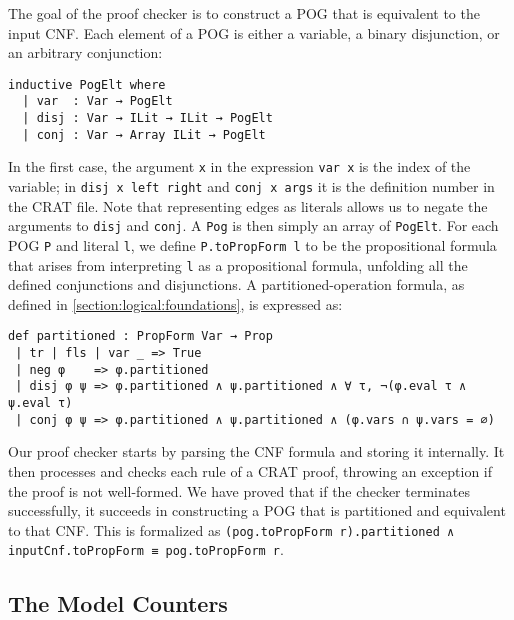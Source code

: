 The goal of the proof checker is to construct a POG that is equivalent to the input CNF.
Each element of a POG  is either a variable, a binary disjunction,
or an arbitrary conjunction:
\begin{lstlisting}
inductive PogElt where
  | var  : Var → PogElt
  | disj : Var → ILit → ILit → PogElt
  | conj : Var → Array ILit → PogElt
\end{lstlisting}
In the first case, the argument \lstinline{x} in the expression
\lstinline{var x} is the index
of the variable; in \lstinline{disj x left right} and \lstinline{conj x args}
it is the definition number in the CRAT file. Note that representing edges as literals allows us to negate the arguments to \lstinline{disj} and \lstinline{conj}.
A \lstinline{Pog} is then simply an array of \lstinline{PogElt}.
For each POG \lstinline{P} and literal \lstinline{l}, we define
\lstinline{P.toPropForm l} to be the
propositional formula that arises from interpreting \lstinline{l} as a propositional
formula, unfolding all the defined conjunctions and disjunctions.
A partitioned-operation formula, as defined in \cref{section:logical:foundations}, is expressed as:
\begin{lstlisting}
def partitioned : PropForm Var → Prop
 | tr | fls | var _ => True
 | neg φ    => φ.partitioned
 | disj φ ψ => φ.partitioned ∧ ψ.partitioned ∧ ∀ τ, ¬(φ.eval τ ∧ ψ.eval τ)
 | conj φ ψ => φ.partitioned ∧ ψ.partitioned ∧ (φ.vars ∩ ψ.vars = ∅)
\end{lstlisting}

Our proof checker starts by parsing the CNF formula and storing it internally.
It then processes and checks each rule of a CRAT proof, throwing an exception if
the proof is not well-formed. We have proved that if the checker terminates successfully,
it succeeds in constructing a POG that is partitioned and equivalent to that CNF. This is formalized as \lstinline{(pog.toPropForm r).partitioned ∧ inputCnf.toPropForm ≡ pog.toPropForm r}.

\subsection{The Model Counters}
\label{subsection:counting}

